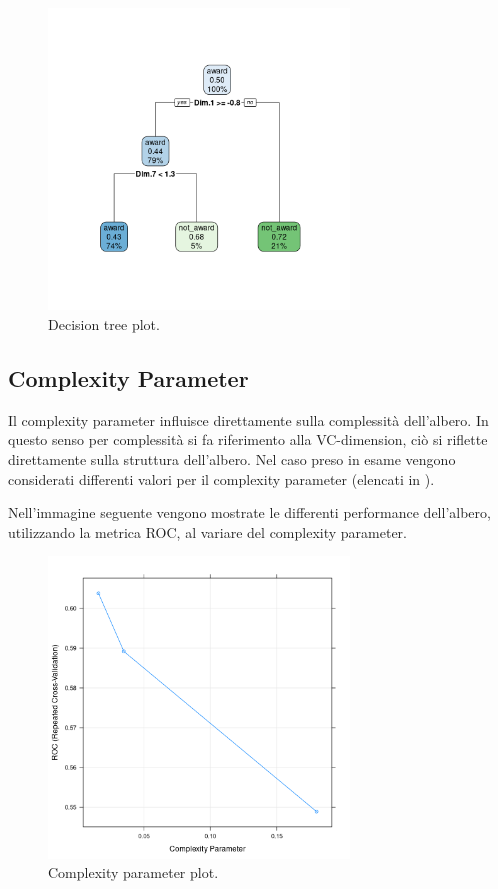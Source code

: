 \begin{figure}[H]
	\centering
	\includegraphics[width=8cm,trim={2.5cm 2.5cm 2.5cm 2.5cm}, clip]{../images/rpart_plot.png}
	\caption{Decision tree plot.}
	\label{fig:decision_tree_plot}
\end{figure}

\subsection{Complexity Parameter}
Il complexity parameter influisce direttamente sulla complessità
dell'albero. In questo senso per complessità si fa riferimento alla
VC-dimension, ciò si riflette direttamente sulla struttura
dell'albero. Nel caso preso in esame vengono considerati differenti
valori per il complexity parameter (elencati in
).

Nell'immagine seguente vengono mostrate le differenti performance
dell'albero, utilizzando la metrica ROC, al variare del complexity
parameter.
\begin{figure}[H]
	\centering
	\includegraphics[width=8cm]{../images/rpart_cp_plot.png}
	\caption{Complexity parameter plot.}
	\label{fig:cp_plot}
\end{figure}

